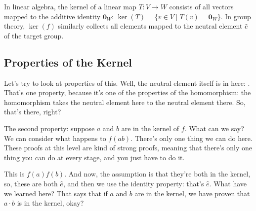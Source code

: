 \begin{content}

\begin{steps}
In linear algebra, the kernel of a linear map $T \colon V \to W$ consists of all vectors mapped to the additive identity $\mathbf{0}_W$: $\ker(T) = \{ v \in V \mid T(v) = \mathbf{0}_W \}$. In group theory, $\operatorname{ker}(f)$ similarly collects all elements mapped to the neutral element $\hat{e}$ of the target group.
\end{steps}
\end{content}

\subsection{Properties of the Kernel}

\begin{speech}[00:20:55 - 00:22:06]
Let's try to look at properties of this. Well, the neutral element itself is in here: . That's one property, because it's one of the properties of the homomorphism: the homomorphism takes the neutral element here to the neutral element there. So, that's there, right?

The second property: suppose $a$ and $b$ are in the kernel of $f$.  What can we say? We can consider what happens to $f(ab)$. There's only one thing we can do here. These proofs at this level are kind of strong proofs, meaning that there's only one thing you can do at every stage, and you just have to do it.

This is $f(a)f(b)$.  And now, the assumption is that they're both in the kernel, so, these are both $\hat{e}$,  and then we use the identity property: that's $\hat{e}$.  What have we learned here? That says that if $a$ and $b$ are in the kernel, we have proven that $a \cdot b$ is in the kernel,  okay?
\end{speech}

